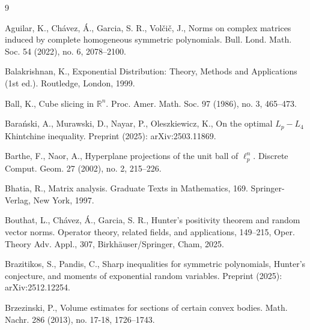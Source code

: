 \documentclass[10pt]{article}
\newcommand{\1}{\textbf{1}}
\newcommand{\R}{\mathbb{R}}
\theoremstyle{remark}
\theoremstyle{definition}
\begin{document}









\begin{thebibliography}{9}


Aguilar, K., Chávez, Á., Garcia, S. R., Volčič, J., Norms on complex matrices induced by complete homogeneous symmetric polynomials. 
Bull. Lond. Math. Soc. 54 (2022), no. 6, 2078--2100.

Balakrishnan, K., Exponential Distribution: Theory, Methods and Applications (1st ed.). Routledge, London, 1999.

Ball, K.,
Cube slicing in $\R^n$. 
Proc. Amer. Math. Soc. 97 (1986), no. 3, 465--473.



Bara\'nski, A., Murawski, D., Nayar, P., Oleszkiewicz, K.,
On the optimal $L_p-L_4$ Khintchine inequality.
Preprint (2025): arXiv:2503.11869.


Barthe, F., Naor, A.,
Hyperplane projections of the unit ball of $\ell_p^n$. 
Discrete Comput. Geom. 27 (2002), no. 2, 215--226. 



Bhatia, R.,
Matrix analysis. 
Graduate Texts in Mathematics, 169. Springer-Verlag, New York, 1997.


Bouthat, L., Chávez, Á., Garcia, S. R.,
Hunter's positivity theorem and random vector norms.
Operator theory, related fields, and applications, 149--215,
Oper. Theory Adv. Appl., 307, Birkhäuser/Springer, Cham, 2025.


Brazitikos, S., Pandis, C.,
Sharp inequalities for symmetric polynomials, Hunter's conjecture, and moments of exponential random variables.
Preprint (2025): arXiv:2512.12254.


Brzezinski, P.,
Volume estimates for sections of certain convex bodies.
Math. Nachr. 286 (2013), no. 17-18, 1726--1743.




\end{thebibliography}
\end{document}
